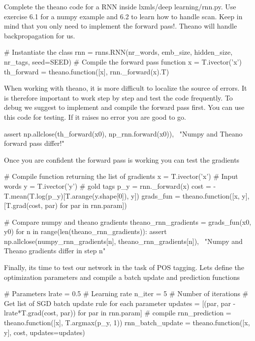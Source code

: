 \begin{exercise}
Complete the theano code for a RNN inside lxmls/deep learning/rnn.py. Use
exercise 6.1 for a numpy example and 6.2 to learn how to handle scan. Keep in
mind that you only need to implement the forward pass!. Theano will handle
backpropagation for us. 
\begin{python}
# Instantiate the class
rnn = rnns.RNN(nr_words, emb_size, hidden_size, nr_tags, seed=SEED)
# Compile the forward pass function
x = T.ivector('x')
th_forward = theano.function([x], rnn._forward(x).T)
\end{python}
When working with theano, it is more difficult to localize the source of
errors. It is therefore important to work step by step and test the
code frequently. To debug we suggest to implement and compile the forward pass
first. You can use this code for testing. If it raises no error you are good to
go.
\begin{python}
assert np.allclose(th_forward(x0), np_rnn.forward(x0)), \
    "Numpy and Theano forward pass differ!"
\end{python}
Once you are confident the forward pass is working you can test the gradients
\begin{python}
# Compile function returning the list of gradients
x = T.ivector('x')     # Input words
y = T.ivector('y')     # gold tags 
p_y = rnn._forward(x)
cost = -T.mean(T.log(p_y)[T.arange(y.shape[0]), y])
grads_fun = theano.function([x, y], [T.grad(cost, par) for par in rnn.param])
\end{python}

\begin{python}
# Compare numpy and theano gradients
theano_rnn_gradients = grads_fun(x0, y0)
for n in range(len(theano_rnn_gradients)): 
    assert np.allclose(numpy_rnn_gradients[n], theano_rnn_gradients[n]), \
        "Numpy and Theano gradients differ in step n"
\end{python}

\noindent Finally, its time to test our network in the task of POS tagging. Lets define
the optimization parameters and compile a batch update  and prediction
functions

\begin{python}
# Parameters
lrate = 0.5   # Learning rate
n_iter = 5    # Number of iterations
# Get list of SGD batch update rule for each parameter
updates = [(par, par - lrate*T.grad(cost, par)) for par in rnn.param]
# compile
rnn_prediction = theano.function([x], T.argmax(p_y, 1))
rnn_batch_update = theano.function([x, y], cost, updates=updates)
\end{python}


\end{exercise}
